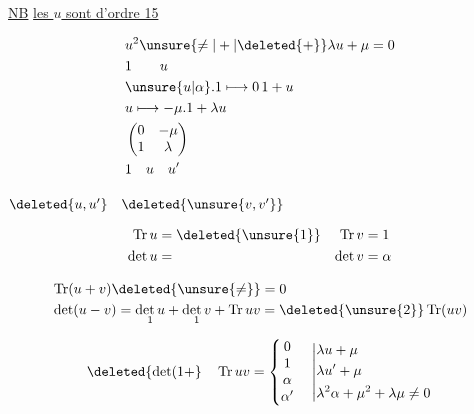 
\quad \uline{NB} \uline{les $u$ sont d'ordre 15}

\[
\begin{aligned}
&u^2\unsure{\ne|+|\deleted{+}}\lambda u+\mu=0\\
&1\qquad u\\
&\unsure{u|\alpha}.1\longmapsto 0\,1+u\\
&u\longmapsto-\mu.1+\lambda u\\
&\begin{pmatrix}0&-\mu\\1&\lambda\end{pmatrix}\\
&1\quad u\quad u'
\end{aligned}
\]

$\deleted{u,u'}\quad\deleted{\unsure{v,v'}}$

\[
\begin{aligned}
\operatorname{Tr}u&=\deleted{\unsure{1}}&\operatorname{Tr}v&=1\\
\det u&=&\det v&=\alpha
\end{aligned}
\]

\[
\begin{aligned}
&\operatorname{Tr}(u+v)\deleted{\unsure{\ne}}=0\\
&\det(u-v)=\underset{1}{\det u}+\underset{1}{\det v}+\operatorname{Tr}uv=\deleted{\unsure{2}}\operatorname{Tr}(uv)
\end{aligned}
\]

\[
\deleted{\det(1+}\quad
\operatorname{Tr}uv=\left\{\begin{matrix}0\\1\\\alpha\\\alpha'\end{matrix}\right.
\quad\left|\begin{aligned}&\lambda u+\mu\\&\lambda u'+\mu\\&\lambda^2\alpha+\mu^2+\lambda\mu\ne0\end{aligned}\right.
\]

